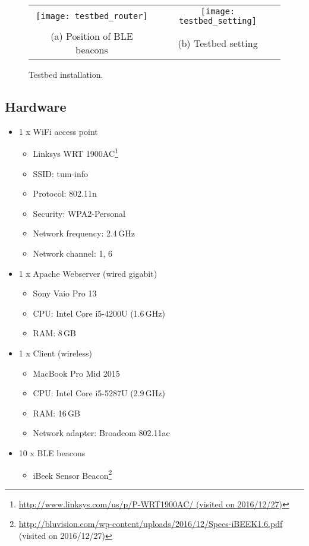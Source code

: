 \begin{figure}
	\centering
	\small
	\begin{tabular}{cc}
		\texttt{[image: testbed\_router]}
		&
		\texttt{[image: testbed\_setting]}
		\\
		(a) Position of BLE beacons & (b) Testbed setting	
	\end{tabular}
	\caption{Testbed installation.}
	\label{fig:TestbedInstallation}
\end{figure}

\subsection{Hardware}
\begin{itemize}
	\item 1 x WiFi access point
	\begin{itemize}
		\item Linksys WRT 
		1900AC\footnote{\url{http://www.linksys.com/us/p/P-WRT1900AC/
		 (visited on 2016/12/27)}}
		\item SSID: tum-info
		\item Protocol: 802.11n
		\item Security: WPA2-Personal
		\item Network frequency: 2.4\,GHz
		\item Network channel: 1, 6
	\end{itemize}
	\item 1 x Apache Webserver (wired gigabit)
	\begin{itemize}
		\item Sony Vaio Pro 13
		\item CPU: Intel Core i5-4200U (1.6\,GHz)
		\item RAM: 8\,GB
	\end{itemize}
	\item 1 x Client (wireless)
	\begin{itemize}
		\item MacBook Pro Mid 2015
		\item CPU: Intel Core i5-5287U (2.9\,GHz)
		\item RAM: 16\,GB
		\item Network adapter: Broadcom 802.11ac
	\end{itemize}
	\item 10 x BLE beacons
	\begin{itemize}
		\item iBeek Sensor 
		Beacon\footnote{\url{http://bluvision.com/wp-content/uploads/2016/12/Specs-iBEEK1.6.pdf}
		 (visited on 2016/12/27)}
	\end{itemize}
\end{itemize}

